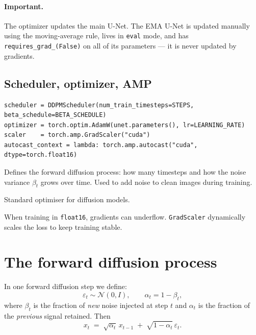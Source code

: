 \documentclass[11pt]{article}
\newcommand{\code}[1]{\texttt{#1}}
\newcommand{\xT}{x_t}
\newcommand{\eps}{\varepsilon}
\begin{document}
\paragraph{Important.} The optimizer updates the main U-Net.
The EMA U-Net is updated manually using the moving-average rule, lives in
\code{eval} mode, and has \code{requires\_grad\_(False)} on all of its
parameters --- it is never updated by gradients.

\subsection{Scheduler, optimizer, AMP}

\begin{lstlisting}
scheduler = DDPMScheduler(num_train_timesteps=STEPS, beta_schedule=BETA_SCHEDULE)
optimizer = torch.optim.AdamW(unet.parameters(), lr=LEARNING_RATE)
scaler    = torch.amp.GradScaler("cuda")
autocast_context = lambda: torch.amp.autocast("cuda", dtype=torch.float16)
\end{lstlisting}

\begin{description}[style=nextline,leftmargin=1.5em]
  \item[\code{DDPMScheduler}] Defines the forward diffusion process: how many
        timesteps and how the noise variance $\beta_t$ grows over time. Used
        to add noise to clean images during training.
  \item[\code{AdamW}] Standard optimiser for diffusion models.
  \item[\code{GradScaler} / \code{autocast}] When training in \code{float16},
        gradients can underflow. \code{GradScaler} dynamically scales the loss
        to keep training stable.
\end{description}

\section{The forward diffusion process}

In one forward diffusion step we define:
\[
  \eps_t \sim \mathcal{N}(0, I), \qquad \alpha_t = 1 - \beta_t,
\]
where $\beta_t$ is the fraction of \emph{new} noise injected at step $t$ and
$\alpha_t$ is the fraction of the \emph{previous} signal retained. Then
\[
  \boxed{\;\xT \;=\; \sqrt{\alpha_t}\,x_{t-1} \;+\; \sqrt{1-\alpha_t}\,\eps_t.\;}
\]
\end{document}
